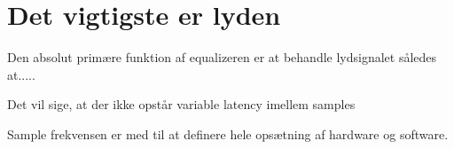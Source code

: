 \section{Det vigtigste er lyden}
Den absolut primære funktion af equalizeren er at behandle lydsignalet således at.....

Det vil sige, at der ikke opstår variable latency imellem samples

Sample frekvensen er med til at definere hele opsætning af hardware og software.

      


